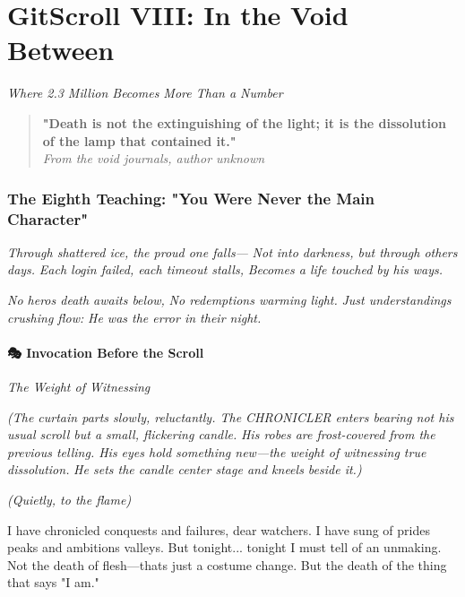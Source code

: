 \chapter{GitScroll VIII: In the Void Between}
\label{chap:08-2}

\emph{Where 2.3 Million Becomes More Than a Number}

\begin{quote}
\textbf{"Death is not the extinguishing of the light; it is the dissolution of the lamp that contained it."}\\
\emph{From the void journals, author unknown}
\end{quote}

\subsection{The Eighth Teaching: "You Were Never the Main Character"}\label{the-eighth-teaching-you-were-never-the-main-character}

\emph{Through shattered ice, the proud one falls---} \emph{Not into darkness, but through others\textquotesingle{} days.} \emph{Each login failed, each timeout stalls,} \emph{Becomes a life touched by his ways.}

\emph{No hero\textquotesingle s death awaits below,} \emph{No redemption\textquotesingle s warming light.} \emph{Just understanding\textquotesingle s crushing flow:} \emph{He was the error in their night.}

\bookdivider

\subsubsection{\texorpdfstring{\textbf{🎭 Invocation Before the Scroll}}{🎭 Invocation Before the Scroll}}\label{performing_arts-invocation-before-the-scroll}

\emph{The Weight of Witnessing}

\emph{(The curtain parts slowly, reluctantly. The CHRONICLER enters bearing not his usual scroll but a small, flickering candle.} \emph{His robes are frost-covered from the previous telling. His eyes hold something new---the weight of witnessing true dissolution.} \emph{He sets the candle center stage and kneels beside it.)}


\emph{(Quietly, to the flame)}

I have chronicled conquests and failures, dear watchers. I have sung of pride\textquotesingle s peaks and ambition\textquotesingle s valleys. But tonight... tonight I must tell of an unmaking. Not the death of flesh---that\textquotesingle s just a costume change. But the death of the thing that says "I am."

